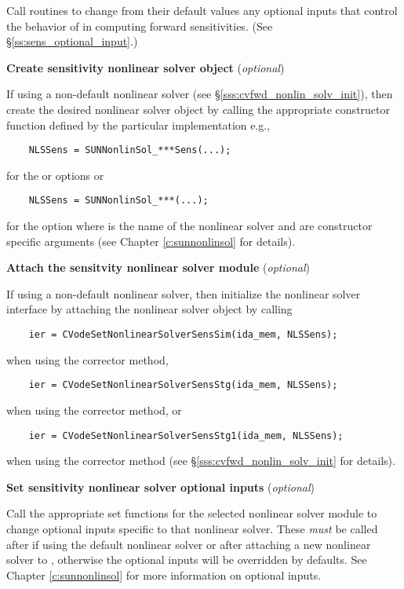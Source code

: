 \begin{Steps}
  Call  routines to change from their default values any
  optional inputs that control the behavior of {\cvodes} in computing forward 
  sensitivities.  (See \S\ref{ss:sens_optional_input}.)

\item 
  {\bf Create sensitivity nonlinear solver object} (\textit{optional})

  If using a non-default nonlinear solver (see
  \S\ref{sss:cvfwd_nonlin_solv_init}), then create the desired nonlinear solver
  object by calling the appropriate constructor function defined by the
  particular {\sunnonlinsol} implementation e.g.,
\begin{verbatim}
    NLSSens = SUNNonlinSol_***Sens(...);
\end{verbatim}
  for the  or  options or
\begin{verbatim}
    NLSSens = SUNNonlinSol_***(...);
\end{verbatim}
  for the  option where \id{***} is the name of the nonlinear
  solver and  are constructor specific arguments (see Chapter
  \ref{c:sunnonlinsol} for details).

\item
  {\bf Attach the sensitvity nonlinear solver module} (\textit{optional})

  If using a non-default nonlinear solver, then initialize the nonlinear solver
  interface by attaching the nonlinear solver object by calling
\begin{verbatim}
    ier = CVodeSetNonlinearSolverSensSim(ida_mem, NLSSens);
\end{verbatim}
  when using the  corrector method,
\begin{verbatim}
    ier = CVodeSetNonlinearSolverSensStg(ida_mem, NLSSens);
\end{verbatim}
  when using the  corrector method, or
\begin{verbatim}
    ier = CVodeSetNonlinearSolverSensStg1(ida_mem, NLSSens);
\end{verbatim}
  when using the  corrector method
  (see \S\ref{sss:cvfwd_nonlin_solv_init} for details).

\item
  {\bf Set sensitivity nonlinear solver optional inputs} (\textit{optional})

  Call the appropriate set functions for the selected nonlinear solver module to
  change optional inputs specific to that nonlinear solver. These \textit{must}
  be called after  if using the default nonlinear solver or after
  attaching a new nonlinear solver to {\cvodes}, otherwise the optional inputs will
  be overridden by {\cvode} defaults. See Chapter \ref{c:sunnonlinsol} for more
  information on optional inputs.


\end{Steps}
